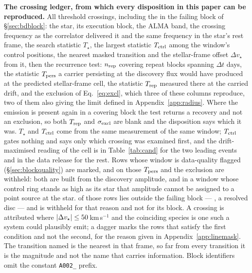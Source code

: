 \begin{table}
\centering
\caption{\textbf{The crossing ledger, from which every disposition in this
paper can be reproduced.} All \EvNCrossRaw{} threshold crossings,
including the \EvNCrossFlag{} in the failing block of \S\ref{sec:bdblock}:
the star, its execution block, the ALMA band, the crossing
frequency as the correlator delivered it and the same frequency in the star's
rest frame, the search statistic $T_\star$, the largest statistic
$T_{\rm ctrl}$ among the window's \NCtrl{} control positions, the nearest
masked transition and the stellar-frame offset $\Delta v_\star$ from it, then
the recurrence test: $n_{\rm rep}$ covering repeat blocks spanning $\Delta t$
days, the statistic $T_{\rm pers}$ a carrier persisting at the discovery flux
would have produced at the predicted stellar-frame cell, the statistic
$T_{\rm rep}$ measured there at the carried drift, and the exclusion of
Eq.~\ref{eq:excl}, which three of these columns reproduce, two of them also
giving the limit defined in Appendix~\ref{app:radius}. Where the emission is
present again in a covering block the test returns a recovery and not an
exclusion, so both $T_{\rm rep}$ and $\sigma_{\rm excl}$ are blank and the
disposition says which it was.
$T_\star$ and $T_{\rm ctrl}$ come from the same measurement of the
same window; $T_{\rm ctrl}$ gates nothing and says only which crossing was
examined first, and the drift-maximised reading of the cell is in
Table~\ref{tab:cand} for the two leading events and in the data release for
the rest. Rows whose window is data-quality flagged
(\S\ref{sec:blockquality}) are marked, and on those $T_{\rm pers}$ and the
exclusion are withheld: both are built from the discovery amplitude, and in a
window whose control ring stands as high as its star that amplitude cannot be
assigned to a point source at the star. \BkFlagNCrossOther{} of those rows
lies outside the failing block --- \BkFlagOtherStar, a resolved disc --- and
is withheld for that reason and not for its block. A
crossing is attributed where
$|\Delta v_\star|\le\MaskHalfKms$\,km\,s$^{-1}$ and the coinciding species is
one such a system could plausibly emit; a dagger marks the \MkNSODecide{}
rows that satisfy the first condition and not the second, for the reason given
in Appendix~\ref{app:linemask}. The transition named is the
nearest in that frame, so far from every transition it is the magnitude and
not the name that carries information. Block identifiers omit the constant
\texttt{A002\_} prefix.}
\label{tab:ledger}
\tiny

\end{table}

